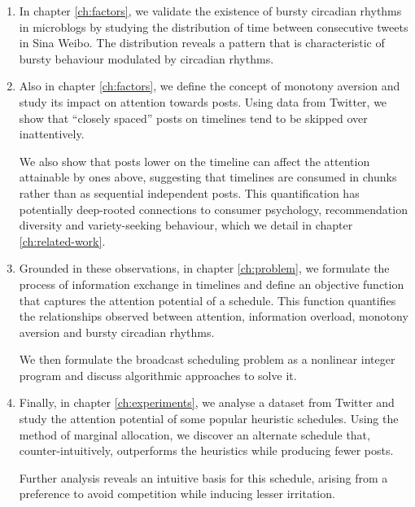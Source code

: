 \documentclass[onesided,letterpaper]{tufte-book}
\begin{document}
\begin{enumerate}
       \item In chapter \ref{ch:factors}, we validate the existence of bursty circadian rhythms in microblogs by studying the distribution of time between consecutive tweets in Sina Weibo. The distribution reveals a pattern that is characteristic of bursty behaviour modulated by circadian rhythms.

       \item Also in chapter \ref{ch:factors}, we define the concept of monotony aversion and study its impact on attention towards posts. Using data from Twitter, we show that ``closely spaced'' posts on timelines tend to be skipped over inattentively.

       We also show that posts lower on the timeline can affect the attention attainable by ones above, suggesting that timelines are consumed in chunks rather than as sequential independent posts. This quantification has potentially deep-rooted connections to consumer psychology, recommendation diversity and variety-seeking behaviour, which we detail in chapter \ref{ch:related-work}.

       \item Grounded in these observations, in chapter \ref{ch:problem}, we formulate the process of information exchange in timelines and define an objective function that captures the attention potential of a schedule. This function quantifies the relationships observed between attention, information overload, monotony aversion and bursty circadian rhythms.

       We then formulate the broadcast scheduling problem as a nonlinear integer program and discuss algorithmic approaches to solve it.

       \item Finally, in chapter \ref{ch:experiments}, we analyse a dataset from Twitter and study the attention potential of some popular heuristic schedules. Using the method of marginal allocation, we discover an alternate schedule that, counter-intuitively, outperforms the heuristics while producing fewer posts.

       Further analysis reveals an intuitive basis for this schedule, arising from a preference to avoid competition while inducing lesser irritation.
\end{enumerate}
\end{document}
